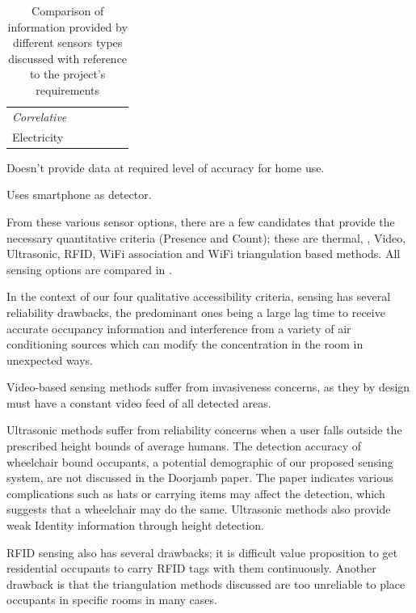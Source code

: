 \documentclass[../thesis/thesis.tex]{subfiles}
\begin{document}
\begin{table}
\begin{threeparttable}
\begin{tabularx}{\textwidth}{|l|l|l||l||l|l|}
\hspace{3mm}\textit{Correlative} 	& & & & & \\
\hspace{8mm}Electricity 		& \cmark\ssup & \xmark & \cmark & & \\

\cline{1-6}
\end{tabularx}
\begin{tablenotes}
\item \ssup  Doesn't provide data at required level of accuracy for home use.
\item \tsup  Uses smartphone as detector.
\end{tablenotes}
\end{threeparttable}
\caption{Comparison of information provided by different sensors types discussed with reference to the project's requirements}
\label{tab:litreview:taxonomycomp}
\end{table}

From these various sensor options, there are a few candidates that provide the necessary quantitative criteria (Presence and Count); these are thermal, \cdi, Video, Ultrasonic, RFID, WiFi association and WiFi triangulation based methods. All sensing options are compared in .

In the context of our four qualitative accessibility criteria, \cdi sensing has several reliability drawbacks, the predominant ones being a large lag time to receive accurate occupancy information and interference from a variety of air conditioning sources which can modify the \cdi concentration in the room in unexpected ways.

Video-based sensing methods suffer from invasiveness concerns, as they by design must have a constant video feed of all detected areas.

Ultrasonic methods suffer from reliability concerns when a user falls outside the prescribed height bounds of average humans. The detection accuracy of wheelchair bound occupants, a potential demographic of our proposed sensing system, are not discussed in the Doorjamb paper. The paper indicates various complications such as hats or carrying items may affect the detection, which suggests that a wheelchair may do the same. Ultrasonic methods also provide weak Identity information through height detection.

RFID sensing also has several drawbacks; it is difficult value proposition to get residential occupants to carry RFID tags with them continuously. Another drawback is that the triangulation methods discussed are too unreliable to place occupants in specific rooms in many cases.
\end{document}
